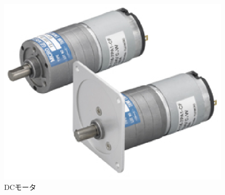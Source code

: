 \begin{figure}[hb]
	\centering
	\includegraphics[clip,scale=0.2]{./figure/te-38f16-24-64.eps}
	\caption{DCモータ}
	\label{dc-motor}
\end{figure}

